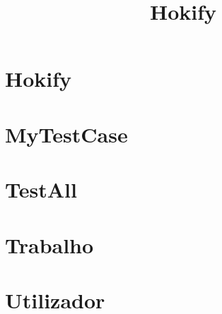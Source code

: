 \documentclass{article}
\begin{document}
\title{Hokify}
\author{}
\maketitle
\tableofcontents

\section{Hokify}

\section{MyTestCase}

\section{TestAll}

\section{Trabalho}

\section{Utilizador}

\end{document}
